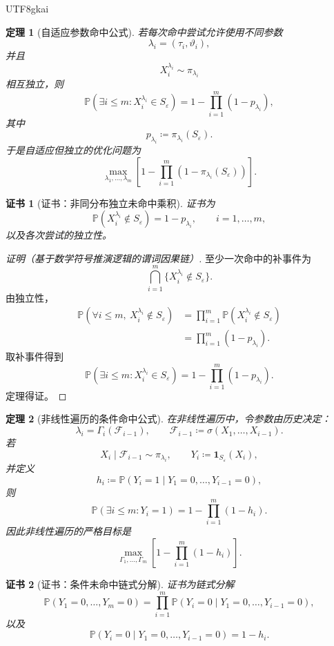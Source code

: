 \documentclass[12pt]{article}
\newtheorem{theorem}{定理}[section]
\newtheorem{Certificate}{证书}[section]
\newcommand{\DefEq}{\coloneqq}
\begin{document}
\begin{CJK*}{UTF8}{gkai}
\begin{theorem}[自适应参数命中公式]
\label{thm:tex55-adaptive-hit}
若每次命中尝试允许使用不同参数
\[
  \lambda_i=(\tau_i,\vartheta_i),
\]
并且
\[
  X_i^{\lambda_i}\sim\pi_{\lambda_i}
\]
相互独立，则
\[
  \mathbb P(\exists i\le m:X_i^{\lambda_i}\in S_\varepsilon)
  =
  1-
  \prod_{i=1}^{m}
  (1-p_{\lambda_i}),
\]
其中
\[
  p_{\lambda_i}\DefEq\pi_{\lambda_i}(S_\varepsilon).
\]
于是自适应但独立的优化问题为
\[
  \boxed{
  \max_{\lambda_1,\ldots,\lambda_m}
  \left[
  1-
  \prod_{i=1}^{m}
  (1-\pi_{\lambda_i}(S_\varepsilon))
  \right].
  }
\]
\end{theorem}

\begin{Certificate}[证书：非同分布独立未命中乘积]
\label{cert:tex55-adaptive-hit}
证书为
\[
  \mathbb P(X_i^{\lambda_i}\notin S_\varepsilon)
  =
  1-p_{\lambda_i},
  \qquad
  i=1,\ldots,m,
\]
以及各次尝试的独立性。
\end{Certificate}

\begin{proof}[证明（基于数学符号推演逻辑的谓词因果链）]
至少一次命中的补事件为
\[
  \bigcap_{i=1}^{m}\{X_i^{\lambda_i}\notin S_\varepsilon\}.
\]
由独立性，
\[
\begin{aligned}
  \mathbb P(\forall i\le m,\ X_i^{\lambda_i}\notin S_\varepsilon)
  &=
  \prod_{i=1}^{m}
  \mathbb P(X_i^{\lambda_i}\notin S_\varepsilon)\\
  &=
  \prod_{i=1}^{m}(1-p_{\lambda_i}).
\end{aligned}
\]
取补事件得到
\[
  \mathbb P(\exists i\le m:X_i^{\lambda_i}\in S_\varepsilon)
  =
  1-\prod_{i=1}^{m}(1-p_{\lambda_i}).
\]
定理得证。
\end{proof}

\begin{theorem}[非线性遍历的条件命中公式]
\label{thm:tex55-nonlinear-conditional-hit}
在非线性遍历中，令参数由历史决定：
\[
  \lambda_i=\Gamma_i(\mathcal F_{i-1}),
  \qquad
  \mathcal F_{i-1}\DefEq\sigma(X_1,\ldots,X_{i-1}).
\]
若
\[
  X_i\mid\mathcal F_{i-1}\sim\pi_{\lambda_i},
  \qquad
  Y_i\DefEq\mathbf 1_{S_\varepsilon}(X_i),
\]
并定义
\[
  h_i
  \DefEq
  \mathbb P(Y_i=1\mid Y_1=0,\ldots,Y_{i-1}=0),
\]
则
\[
  \boxed{
  \mathbb P(\exists i\le m:Y_i=1)
  =
  1-
  \prod_{i=1}^{m}(1-h_i).
  }
\]
因此非线性遍历的严格目标是
\[
  \boxed{
  \max_{\Gamma_1,\ldots,\Gamma_m}
  \left[
  1-
  \prod_{i=1}^{m}(1-h_i)
  \right].
  }
\]
\end{theorem}

\begin{Certificate}[证书：条件未命中链式分解]
\label{cert:tex55-nonlinear-conditional-hit}
证书为链式分解
\[
  \mathbb P(Y_1=0,\ldots,Y_m=0)
  =
  \prod_{i=1}^{m}
  \mathbb P(Y_i=0\mid Y_1=0,\ldots,Y_{i-1}=0),
\]
以及
\[
  \mathbb P(Y_i=0\mid Y_1=0,\ldots,Y_{i-1}=0)=1-h_i.
\]
\end{Certificate}


\end{CJK*}
\end{document}
